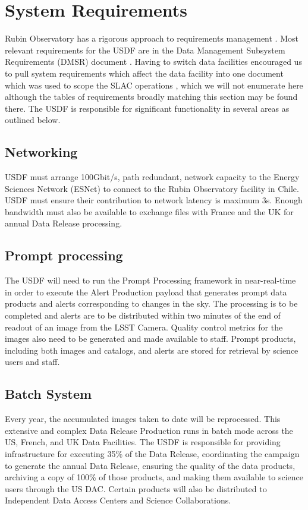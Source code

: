 \section{System Requirements} \label{sec:requirements}

Rubin Observatory has a rigorous approach to requirements management \cite{2016SPIE.9911E..0DS}.
Most relevant requirements for the USDF are in the Data Management Subsystem Requirements (DMSR) document \cite{LSE-61}.
Having to switch data facilities encouraged us to pull system requirements which affect the data facility into one document
which was used to scope the SLAC operations \cite{rtn-080}, which we will not enumerate here although the tables of requirements broadly matching this section may be found there.
The USDF is responsible for significant functionality in several areas as outlined below.


\subsection{Networking } \label{sec:networking}

USDF must arrange 100Gbit/s, path redundant, network capacity to the Energy Sciences Network (ESNet) to connect to the Rubin Observatory facility in Chile.
USDF must ensure their contribution to network latency is maximum 3s.
Enough bandwidth must also be available to exchange files with France and the UK for annual Data Release processing.

\subsection{Prompt processing} \label{sec:prompproc}
The USDF will need to run the Prompt Processing framework in near-real-time in order to execute the Alert Production payload that generates prompt data products and alerts corresponding to changes in the sky.
The processing is to be completed and alerts are to be distributed within two minutes of the end of readout of an image from the LSST Camera.
Quality control metrics for the images also need to be generated and made available to staff.
Prompt products, including both images and catalogs, and alerts are stored for retrieval by science users and staff.

\subsection{Batch System} \label{sec:offlineprod}
Every year, the accumulated images taken to date will be reprocessed.
This extensive and complex Data Release Production runs in batch mode across the US, French, and UK Data Facilities.
The USDF is responsible for providing infrastructure for executing 35\% of the Data Release, coordinating the campaign to generate the annual Data Release, ensuring the quality of the data products, archiving a copy of 100\% of those products, and making them available to science users through the US DAC.
Certain products will also be distributed to Independent Data Access Centers and Science Collaborations.\cite{RTN-003}


